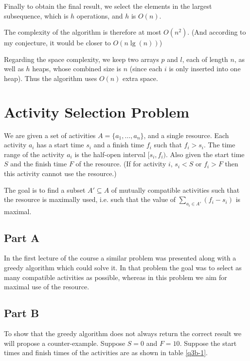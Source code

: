 \documentclass{article}
\begin{document}
Finally to obtain the final result, we select the elements in the largest subsequence, which is \(h\) operations, and \(h\) is \(O(n)\).

The complexity of the algorithm is therefore at most \(O(n^2)\). (And according to my conjecture, it would be closer to \(O(n\lg(n))\))

Regarding the space complexity, we keep two arrays \(p\) and \(l\), each of length \(n\), as well as \(h\) heaps, whose combined size is \(n\) (since each \(i\) is only inserted into one heap). Thus the algorithm uses \(O(n)\) extra space.

\section{Activity Selection Problem}

We are given a set of activities \(A = \{a_1, \dots, a_n\}\), and a single resource. Each activity \(a_i\) has a start time \(s_i\) and a finish time \(f_i\) such that \(f_i > s_i\). The time range of the activity \(a_i\) is the half-open interval \([s_i, f_i)\). Also given the start time \(S\) and the finish time \(F\) of the resource. (If for activity \(i\), \(s_i < S\) or \(f_i > F\) then this activity cannot use the resource.)

The goal is to find a subset \(A' \subseteq A\) of mutually compatible activities such that the resource is maximally used, i.e. such that the value of \(\sum_{a_i \in A'}(f_i - s_i)\) is maximal.

\subsection*{Part A}

In the first lecture of the course a similar problem was presented along with a greedy algorithm which could solve it. In that problem the goal was to select as many compatible activities as possible, whereas in this problem we aim for maximal use of the resource.

\subsection*{Part B}

To show that the greedy algorithm does not always return the correct result we will propose a counter-example. Suppose \(S = 0\) and \(F = 10\). Suppose the start times and finish times of the activities are as shown in table \ref{q3b-1}.
\end{document}
